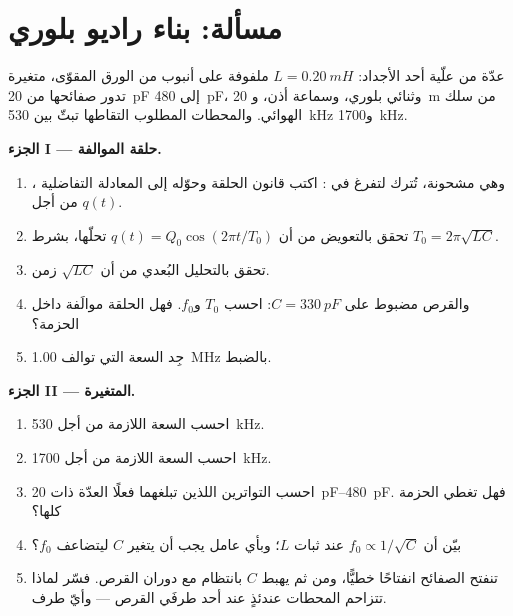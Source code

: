 \section{مسألة: بناء راديو بلوري}

\begin{problem}
\label{pb:g12:rlc-oscillations:1}
عدّة من علّية أحد الأجداد:  $L = \qty{0.20}{mH}$ ملفوفة على
أنبوب من الورق المقوّى،  متغيرة تدور صفائحها من
\qty{20}{pF} إلى \qty{480}{pF}، وثنائي بلوري، وسماعة أذن، و
\qty{20}{m} من سلك الهوائي. والمحطات المطلوب التقاطها تبثّ بين
\qty{530}{kHz} و\qty{1700}{kHz}.

\medskip
\noindent\textbf{الجزء I --- حلقة الموالفة.}
\begin{enumerate}
  \item {}، وهي مشحونة، تُترك لتفرغ في :
        اكتب قانون الحلقة وحوّله إلى المعادلة التفاضلية
        من أجل $q(t)$.
  \item تحقق بالتعويض من أن $q(t) = Q_0\cos(2\pi t/T_0)$
        تحلّها، بشرط $T_0 = 2\pi\sqrt{LC}$.
  \item تحقق بالتحليل البُعدي من أن $\sqrt{LC}$ زمن.
  \item والقرص مضبوط على $C = \qty{330}{pF}$: احسب $T_0$ و$f_0$. فهل
        الحلقة موالَفة داخل الحزمة؟
  \item جِد السعة التي توالف \qty{1.00}{MHz} بالضبط.
\end{enumerate}

\medskip
\noindent\textbf{الجزء II ---  المتغيرة.}
\begin{enumerate}[resume]
  \item احسب السعة اللازمة من أجل \qty{530}{kHz}.
  \item احسب السعة اللازمة من أجل \qty{1700}{kHz}.
  \item احسب التواترين اللذين تبلغهما فعلًا  العدّة
        ذات \qtyrange{20}{480}{pF}. فهل تغطي الحزمة كلها؟
  \item بيّن أن $f_0 \propto 1/\sqrt{C}$ عند ثبات $L$؛ وبأي
        عامل يجب أن يتغير $C$ ليتضاعف $f_0$؟
  \item تنفتح الصفائح انفتاحًا خطيًّا، ومن ثم يهبط $C$ بانتظام مع دوران
        القرص. فسّر لماذا تتزاحم المحطات عندئذٍ عند أحد طرفَي
        القرص --- وأيّ طرف.
\end{enumerate}


\end{problem}
